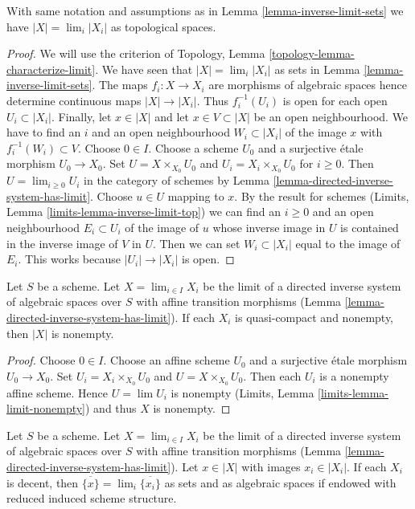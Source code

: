 \begin{lemma}
\label{lemma-topology-limit}
With same notation and assumptions as in Lemma \ref{lemma-inverse-limit-sets}
we have $|X| = \lim_i |X_i|$ as topological spaces.
\end{lemma}

\begin{proof}
We will use the criterion of
Topology, Lemma \ref{topology-lemma-characterize-limit}.
We have seen that $|X| = \lim_i |X_i|$ as sets in
Lemma \ref{lemma-inverse-limit-sets}.
The maps $f_i : X \to X_i$ are morphisms of algebraic spaces
hence determine continuous maps $|X| \to |X_i|$.
Thus $f_i^{-1}(U_i)$ is open for each
open $U_i \subset |X_i|$. Finally, 
let $x \in |X|$ and let $x \in V \subset |X|$ be an open
neighbourhood. We have to find an $i$ and an open neighbourhood
$W_i \subset |X_i|$ of the image $x$
with $f_i^{-1}(W_i) \subset V$.
Choose $0 \in I$. Choose a scheme $U_0$ and a surjective
\'etale morphism $U_0 \to X_0$. Set $U = X \times_{X_0} U_0$
and $U_i = X_i \times_{X_0} U_0$ for $i \geq 0$.
Then $U = \lim_{i \geq 0} U_i$ in the category of schemes by
Lemma \ref{lemma-directed-inverse-system-has-limit}.
Choose $u \in U$ mapping to $x$. By the result for schemes
(Limits, Lemma \ref{limits-lemma-inverse-limit-top})
we can find an $i \geq 0$ and an open neighbourhood
$E_i \subset U_i$ of the image of $u$
whose inverse image in $U$ is contained in the
inverse image of $V$ in $U$. Then we can set $W_i \subset |X_i|$
equal to the image of $E_i$. This works because $|U_i| \to |X_i|$ is open.
\end{proof}

\begin{lemma}
\label{lemma-limit-nonempty}
Let $S$ be a scheme. Let $X = \lim_{i \in I} X_i$ be the limit of a directed
inverse system of algebraic spaces over $S$ with affine transition morphisms
(Lemma \ref{lemma-directed-inverse-system-has-limit}). If each $X_i$
is quasi-compact and nonempty, then $|X|$ is nonempty.
\end{lemma}

\begin{proof}
Choose $0 \in I$.
Choose an affine scheme $U_0$ and a surjective \'etale morphism $U_0 \to X_0$.
Set $U_i = X_i \times_{X_0} U_0$ and $U = X \times_{X_0} U_0$.
Then each $U_i$ is a nonempty affine scheme. Hence $U = \lim U_i$
is nonempty (Limits, Lemma \ref{limits-lemma-limit-nonempty}) and thus
$X$ is nonempty.
\end{proof}

\begin{lemma}
\label{lemma-inverse-limit-irreducibles}
Let $S$ be a scheme. Let $X = \lim_{i \in I} X_i$ be the limit of a directed
inverse system of algebraic spaces over $S$ with affine transition morphisms
(Lemma \ref{lemma-directed-inverse-system-has-limit}).
Let $x \in |X|$ with images $x_i \in |X_i|$. If each $X_i$ is decent,
then $\overline{\{x\}} = \lim_i \overline{\{x_i\}}$ as sets
and as algebraic spaces if endowed with reduced induced scheme structure.
\end{lemma}

